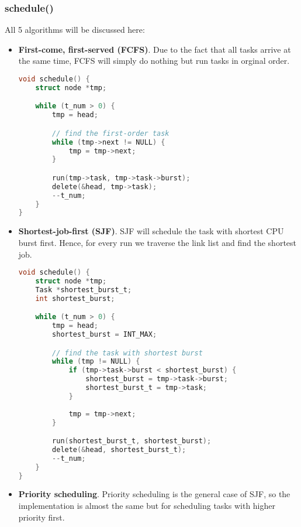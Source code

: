 \documentclass{article}
\begin{document}
\subsubsection*{schedule()}
All 5 algorithms will be discussed here:

\begin{itemize}
    \item \textbf{First-come, first-served (FCFS)}. Due to the fact that all tasks arrive at the same time, FCFS will simply do nothing but run tasks in orginal order.
    
    \begin{lstlisting}[language=c, caption={schedule() for FCFS}]
void schedule() {
    struct node *tmp;

    while (t_num > 0) {
        tmp = head;

        // find the first-order task
        while (tmp->next != NULL) {
            tmp = tmp->next;
        }

        run(tmp->task, tmp->task->burst);
        delete(&head, tmp->task);
        --t_num;
    }
}
    \end{lstlisting}

    \item \textbf{Shortest-job-first (SJF)}. SJF will schedule the task with shortest CPU burst first. Hence, for every run we traverse the link list and find the shortest job.
    
    \begin{lstlisting}[language=c, caption={schedule() for SJF}]
void schedule() {
    struct node *tmp;
    Task *shortest_burst_t;
    int shortest_burst;

    while (t_num > 0) {
        tmp = head;
        shortest_burst = INT_MAX;

        // find the task with shortest burst
        while (tmp != NULL) {
            if (tmp->task->burst < shortest_burst) {
                shortest_burst = tmp->task->burst;
                shortest_burst_t = tmp->task;
            }
            
            tmp = tmp->next;
        }

        run(shortest_burst_t, shortest_burst);
        delete(&head, shortest_burst_t);
        --t_num;
    }
}
    \end{lstlisting}

    \item \textbf{Priority scheduling}. Priority scheduling is the general case of SJF, so the implementation is almost the same but for scheduling tasks with higher priority first.
    

\end{itemize}
\end{document}
